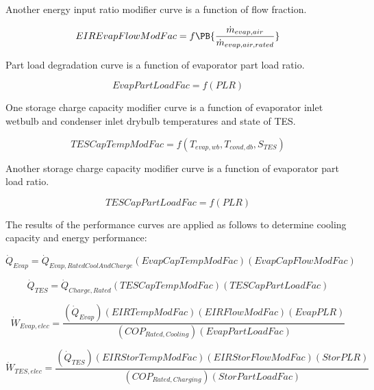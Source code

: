 Another energy input ratio modifier curve is a function of flow fraction.

\begin{equation}
EIREvapFlowModFac = f\PB{\frac{\dot{m}_{evap,air}}{\dot{m}_{evap,air,rated}}}
\end{equation}

Part load degradation curve is a function of evaporator part load ratio.

\begin{equation}
EvapPartLoadFac = f\left( {PLR} \right)
\end{equation}

One storage charge capacity modifier curve is a function of evaporator inlet wetbulb and condenser inlet drybulb temperatures and state of TES.

\begin{equation}
TESCapTempModFac = f\left( {{T_{evap,wb}},{T_{cond,db}},{S_{TES}}} \right)
\end{equation}

Another storage charge capacity modifier curve is a function of evaporator part load ratio.

\begin{equation}
TESCapPartLoadFac = f\left( {PLR} \right)
\end{equation}

The results of the performance curves are applied as follows to determine cooling capacity and energy performance:

\begin{equation}
{\dot Q_{Evap}} = {\dot Q_{Evap,RatedCoolAndCharge}}\left( {EvapCapTempModFac} \right)\left( {EvapCapFlowModFac} \right)
\end{equation}

\begin{equation}
{\dot Q_{TES}} = {\dot Q_{Charge,Rated}}\left( {TESCapTempModFac} \right)\left( {TESCapPartLoadFac} \right)
\end{equation}

\begin{equation}
{\dot W_{Evap,elec}} = \frac{{\left( {{{\dot Q}_{Evap}}} \right)\left( {EIRTempModFac} \right)\left( {EIRFlowModFac} \right)\left( {EvapPLR} \right)}}{{\left( {CO{P_{Rated,Cooling}}} \right)\left( {EvapPartLoadFac} \right)}}
\end{equation}

\begin{equation}
{\dot W_{TES,elec}} = \frac{{\left( {{{\dot Q}_{TES}}} \right)\left( {EIRStorTempModFac} \right)\left( {EIRStorFlowModFac} \right)\left( {StorPLR} \right)}}{{\left( {CO{P_{Rated,Charging}}} \right)\left( {StorPartLoadFac} \right)}}
\end{equation}

